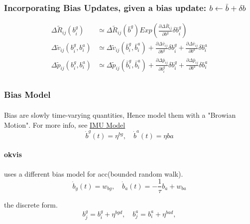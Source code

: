 \documentclass[10pt,a4paper]{article}
\begin{document}
\subsubsection{Incorporating Bias Updates, given a bias update: $b \leftarrow \bar{b} + \delta b$}
\begin{subequations}
	\begin{align}
	\Delta \tilde{R}_{ij}(b_i^g)  &\simeq \Delta \tilde{R}_{ij}(\bar{b}^g) 
	Exp(\frac{\partial \Delta \bar{R}_{ij}}{\partial b^g} \delta b_i^g)\\
	\Delta \tilde{v}_{ij}(b_i^g, b_i^a) &\simeq \Delta \tilde{v}_{ij}(\bar{b}_i^g, \bar{b}_i^a) + 
	\frac{\partial \Delta \bar{v}_{ij}}{\partial b^g} \delta b_i^g + 
	\frac{\partial \Delta \bar{v}_{ij}}{\partial b^a} \delta b_i^a\\
	 \Delta \tilde{p}_{ij}(b_i^g, b_i^a) &\simeq \Delta \tilde{p}_{ij}(\bar{b}_i^g, \bar{b}_i^a) +
	 	\frac{\partial \Delta \bar{p}_{ij}}{\partial b_i^g} \delta b_i^g + 
	 \frac{\partial \Delta \bar{p}_{ij}}{\partial b^a} \delta b_i^a\\
	\end{align}	
\end{subequations}

\subsubsection{Bias Model}
\paragraph{}Bias are slowly time-varying quantities, Hence model them with a "Browian Motion".
For more info, see \href{http://www.cnblogs.com/youzx/p/6291327.html?utm_source=itdadao&utm_medium=referral}{IMU Model}
\begin{equation}
\dot{b}^g(t) = \eta^{bg}, \quad \dot{b}^a(t) = \eta{ba}
\end{equation}

\paragraph{okvis} uses a different bias model for acc(bounded random walk).
\begin{equation}
\dot{b}_g(t) = w_{bg}, \quad \dot{b}_a(t) = -\frac{1}{\tau} b_a + w_{ba}
\end{equation}


the discrete form.
\begin{equation}
b^g_j= b^g_i + \eta^{bgd}, \quad b^a_j= b^a_i + \eta^{bad},
\end{equation}
\end{document}
